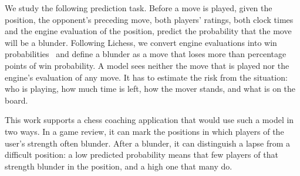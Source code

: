 \documentclass[11pt]{article}
\begin{document}
We study the following prediction task. Before a move is played, given the
position, the opponent's preceding move, both players' ratings, both clock
times and the engine evaluation of the position, predict the probability that
the move will be a blunder. Following Lichess, we convert engine evaluations
into win probabilities~\cite{lichessaccuracy} and define a blunder as a move
that loses more than  percentage points of win
probability. A model sees neither the move that is played nor the engine's
evaluation of any move. It has to estimate the risk from the situation: who
is playing, how much time is left, how the mover stands, and what is on the
board.

This work supports a chess coaching application that would use such a model
in two ways. In a game review, it can mark the positions in which players of
the user's strength often blunder. After a blunder, it can distinguish a
lapse from a difficult position: a low predicted probability means that few
players of that strength blunder in the position, and a high one that many
do.
\end{document}
